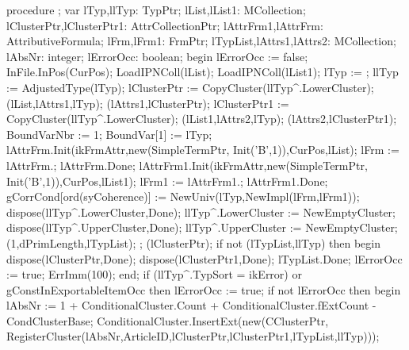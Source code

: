 \nwenddocs{}\endmoddef\nwstartdeflinemarkup{}\nwenddeflinemarkup
procedure ;
var
   lTyp,llTyp: TypPtr;
   lList,lList1: MCollection;
   lClusterPtr,lClusterPtr1: AttrCollectionPtr;
   lAttrFrm1,lAttrFrm: AttributiveFormula;
   lFrm,lFrm1: FrmPtr;
   lTypList,lAttrs1,lAttrs2: MCollection;
   lAbsNr: integer;
   lErrorOcc: boolean;
begin
   lErrorOcc := false;
   InFile.InPos(CurPos);
   LoadIPNColl(lList);
   LoadIPNColl(lList1);
   lTyp := ;
   llTyp := AdjustedType(lTyp);
   lClusterPtr := CopyCluster(llTyp^.LowerCluster);
   (lList,lAttrs1,lTyp);
   (lAttrs1,lClusterPtr);
   lClusterPtr1 := CopyCluster(llTyp^.LowerCluster);
   (lList1,lAttrs2,lTyp);
   (lAttrs2,lClusterPtr1);
   BoundVarNbr := 1;
   BoundVar[1] := lTyp;
   lAttrFrm.Init(ikFrmAttr,new(SimpleTermPtr, Init('B',1)),CurPos,lList);
   lFrm := lAttrFrm.;
   lAttrFrm.Done;
   lAttrFrm1.Init(ikFrmAttr,new(SimpleTermPtr, Init('B',1)),CurPos,lList1);
   lFrm1 := lAttrFrm1.;
   lAttrFrm1.Done;
   gCorrCond[ord(syCoherence)] := NewUniv(lTyp,NewImpl(lFrm,lFrm1));
   dispose(llTyp^.LowerCluster,Done);
   llTyp^.LowerCluster := NewEmptyCluster;
   dispose(llTyp^.UpperCluster,Done);
   llTyp^.UpperCluster := NewEmptyCluster;
   (1,dPrimLength,lTypList);
   ;
   (lClusterPtr);
   if not (lTypList,llTyp) then
   begin
      dispose(lClusterPtr,Done);
      dispose(lClusterPtr1,Done);
      lTypList.Done;
      lErrorOcc := true;
      ErrImm(100);
   end;
   if (llTyp^.TypSort = ikError) or gConstInExportableItemOcc then lErrorOcc := true;
   if not lErrorOcc then
   begin
      lAbsNr :=  1 + ConditionalCluster.Count + ConditionalCluster.fExtCount - CondClusterBase;
      ConditionalCluster.InsertExt(new(CClusterPtr,
                                       RegisterCluster(lAbsNr,ArticleID,lClusterPtr,lClusterPtr1,lTypList,llTyp)));
